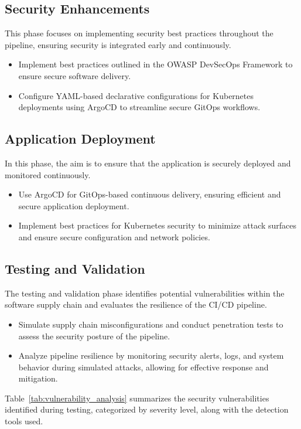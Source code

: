 \documentclass[conference]{IEEEtran}
\begin{document}
\subsection{Security Enhancements}
This phase focuses on implementing security best practices throughout the pipeline, ensuring security is integrated early and continuously.
\begin{itemize}
    \item Implement best practices outlined in the OWASP DevSecOps Framework to ensure secure software delivery.
    \item Configure YAML-based declarative configurations for Kubernetes deployments using ArgoCD to streamline secure GitOps workflows.
\end{itemize}

\subsection{Application Deployment}
In this phase, the aim is to ensure that the application is securely deployed and monitored continuously.
\begin{itemize}
    \item Use ArgoCD for GitOps-based continuous delivery, ensuring efficient and secure application deployment.
    \item Implement best practices for Kubernetes security to minimize attack surfaces and ensure secure configuration and network policies.
\end{itemize}

\subsection{Testing and Validation}
The testing and validation phase identifies potential vulnerabilities within the software supply chain and evaluates the resilience of the CI/CD pipeline.

\begin{itemize}
    \item Simulate supply chain misconfigurations and conduct penetration tests to assess the security posture of the pipeline.
    \item Analyze pipeline resilience by monitoring security alerts, logs, and system behavior during simulated attacks, allowing for effective response and mitigation.
\end{itemize}

Table~\ref{tab:vulnerability_analysis} summarizes the security vulnerabilities identified during testing, categorized by severity level, along with the detection tools used.
\end{document}
